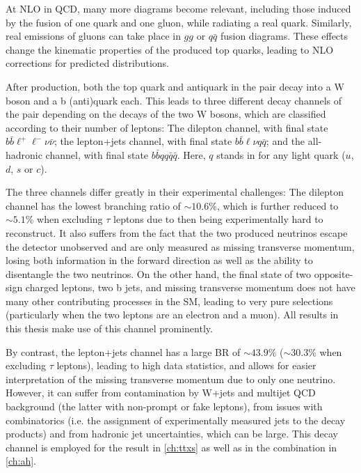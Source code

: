 At NLO in QCD, many more diagrams become relevant, including those induced by the fusion of one quark and one gluon, while radiating a real quark. Similarly, real emissions of gluons can take place in $gg$ or $q\bar{q}$ fusion diagrams. These effects change the kinematic properties of the produced top quarks, leading to NLO corrections for predicted distributions.

After production, both the top quark and antiquark in the \ttbar pair decay into a W boson and a b (anti)quark each. This leads to three different decay channels of the \ttbar pair depending on the decays of the two W bosons, which are classified according to their number of leptons: The dilepton channel, with final state $b \bar{b} \ell^+ \ell^- \nu \bar{\nu}$; the lepton+jets channel, with final state $b \bar{b} \ell \nu q \bar{q}$; and the all-hadronic channel, with final state $b \bar{b} q q \bar{q} \bar{q}$. Here, $q$ stands in for any light quark ($u$, $d$, $s$ or $c$).

The three channels differ greatly in their experimental challenges: The dilepton channel has the lowest branching ratio of $\sim10.6\%$, which is further reduced to $\sim5.1\%$ when excluding $\tau$ leptons due to then being experimentally hard to reconstruct. It also suffers from the fact that the two produced neutrinos escape the detector unobserved and are only measured as missing transverse momentum, losing both information in the forward direction as well as the ability to disentangle the two neutrinos. On the other hand, the final state of two opposite-sign charged leptons, two b jets, and missing transverse momentum does not have many other contributing processes in the SM, leading to very pure selections (particularly when the two leptons are an electron and a muon). All results in this thesis make use of this channel prominently.

By contrast, the lepton+jets channel has a large BR of $\sim43.9\%$ ($\sim30.3\%$ when excluding $\tau$ leptons), leading to high data statistics, and allows for easier interpretation of the missing transverse momentum due to only one neutrino. However, it can suffer from contamination by W+jets and multijet QCD background (the latter with non-prompt or fake leptons), from issues with combinatorics (i.e. the assignment of experimentally measured jets to the decay products) and from hadronic jet uncertainties, which can be large. This decay channel is employed for the result in \cref{ch:ttxs} as well as in the combination in \cref{ch:ah}.


